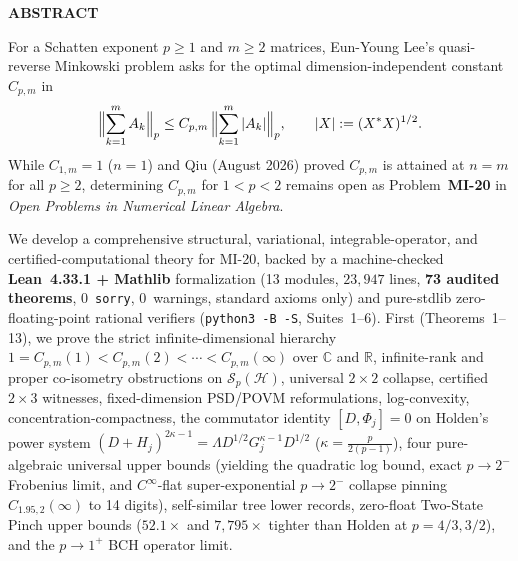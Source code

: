 \documentclass[10pt,letterpaper]{article}
\newcommand{\C}{\mathbb{C}}
\newcommand{\R}{\mathbb{R}}
\newcommand{\Hilb}{\mathcal{H}}
\newcommand{\Sp}{\mathcal{S}_p}
\begin{document}
\begin{tcolorbox}[abstractbox]
{\sffamily\footnotesize\bfseries\color{accentblue}ABSTRACT}\par\vspace{1.5pt}
{\small
For a Schatten exponent $p \ge 1$ and $m \ge 2$ matrices, Eun-Young Lee's quasi-reverse Minkowski problem asks for the optimal dimension-independent constant $C_{p,m}$ in
\[
  \Bigl\|\sum_{k=1}^m A_k\Bigr\|_p \le C_{p,m}\,\Bigl\|\sum_{k=1}^m |A_k|\Bigr\|_p,
  \qquad |X| := (X^* X)^{1/2}.
\]
While $C_{1,m} = 1$ ($n = 1$) and Qiu (August 2026) proved $C_{p,m}$ is attained at $n = m$ for all $p \ge 2$, determining $C_{p,m}$ for $1 < p < 2$ remains open as Problem~\textbf{MI-20} in \emph{Open Problems in Numerical Linear Algebra}.

We develop a comprehensive structural, variational, integrable-operator, and certified-computational theory for MI-20, backed by a machine-checked \textbf{Lean~4.33.1 + Mathlib} formalization (13 modules, $23{,}947$ lines, \textbf{73 audited theorems}, 0~\texttt{sorry}, 0~warnings, standard axioms only) and pure-stdlib zero-floating-point rational verifiers (\texttt{python3 -B -S}, Suites~1--6). First (Theorems~1--13), we prove the strict infinite-dimensional hierarchy $1 = C_{p,m}(1) < C_{p,m}(2) < \cdots < C_{p,m}(\infty)$ over $\C$ and $\R$, infinite-rank and proper co-isometry obstructions on $\Sp(\Hilb)$, universal $2\times 2$ collapse, certified $2\times 3$ witnesses, fixed-dimension PSD/POVM reformulations, log-convexity, concentration-compactness, the commutator identity $[D,\Phi_j]=0$ on Holden's power system $(D+H_j)^{2\kappa-1} = \Lambda D^{1/2} G_j^{\kappa-1} D^{1/2}$ ($\kappa = \frac{p}{2(p-1)}$), four pure-algebraic universal upper bounds (yielding the quadratic log bound, exact $p \to 2^-$ Frobenius limit, and $C^\infty$-flat super-exponential $p \to 2^-$ collapse pinning $C_{1.95,2}(\infty)$ to 14 digits), self-similar tree lower records, zero-float Two-State Pinch upper bounds ($52.1\times$ and $7{,}795\times$ tighter than Holden at $p = 4/3, 3/2$), and the $p \to 1^+$ BCH operator limit.

}
\end{tcolorbox}
\end{document}
